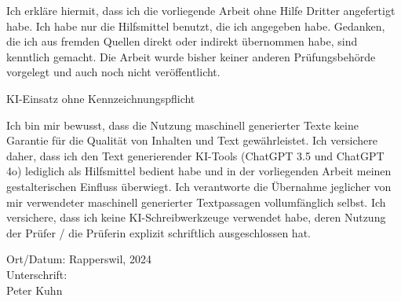 

Ich erkläre hiermit, dass ich die vorliegende Arbeit ohne Hilfe Dritter angefertigt habe. Ich habe nur die Hilfsmittel benutzt, die ich angegeben habe. Gedanken, die ich aus fremden Quellen direkt oder indirekt übernommen habe, sind kenntlich gemacht. Die Arbeit wurde bisher keiner anderen Prüfungsbehörde vorgelegt und auch noch nicht veröffentlicht.

KI-Einsatz ohne Kennzeichnungspflicht

Ich bin mir bewusst, dass die Nutzung maschinell generierter Texte keine Garantie für die Qualität von Inhalten und Text gewährleistet. Ich versichere daher, dass ich den Text generierender KI-Tools (ChatGPT 3.5 und ChatGPT 4o) lediglich als Hilfsmittel bedient habe und in der vorliegenden Arbeit meinen gestalterischen Einfluss überwiegt. Ich verantworte die Übernahme jeglicher von mir verwendeter maschinell generierter Textpassagen vollumfänglich selbst. Ich versichere, dass ich keine KI-Schreibwerkzeuge verwendet habe, deren Nutzung der Prüfer / die Prüferin explizit schriftlich ausgeschlossen hat.



Ort/Datum: Rapperswil, 2024 \\
Unterschrift:\\
Peter Kuhn
